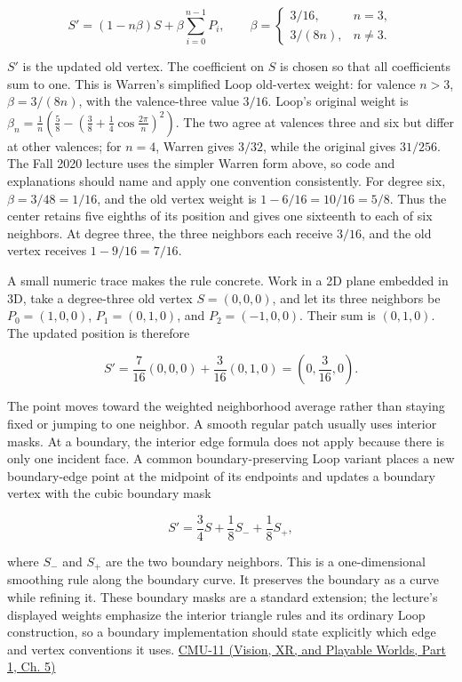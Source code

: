 \[
S'=(1-n\beta)S+\beta\sum_{i=0}^{n-1}P_i,
\qquad
\beta=\begin{cases}
3/16,&n=3,\\
3/(8n),&n\ne3.
\end{cases}
\]

\(S'\) is the updated old vertex. The coefficient on \(S\) is chosen so that all coefficients sum to one. This is Warren's simplified Loop old-vertex weight: for valence \(n>3\), \(\beta=3/(8n)\), with the valence-three value \(3/16\). Loop's original weight is \(\beta_n=\frac1n\left(\frac58-\left(\frac38+\frac14\cos\frac{2\pi}{n}\right)^2\right)\). The two agree at valences three and six but differ at other valences; for \(n=4\), Warren gives \(3/32\), while the original gives \(31/256\). The Fall 2020 lecture uses the simpler Warren form above, so code and explanations should name and apply one convention consistently. For degree six, \(\beta=3/48=1/16\), and the old vertex weight is \(1-6/16=10/16=5/8\). Thus the center retains five eighths of its position and gives one sixteenth to each of six neighbors. At degree three, the three neighbors each receive \(3/16\), and the old vertex receives \(1-9/16=7/16\).

A small numeric trace makes the rule concrete. Work in a 2D plane embedded in 3D, take a degree-three old vertex \(S=(0,0,0)\), and let its three neighbors be \(P_0=(1,0,0)\), \(P_1=(0,1,0)\), and \(P_2=(-1,0,0)\). Their sum is \((0,1,0)\). The updated position is therefore

\[
S'=\frac{7}{16}(0,0,0)+\frac{3}{16}(0,1,0)
=\left(0,\frac{3}{16},0\right).
\]

The point moves toward the weighted neighborhood average rather than staying fixed or jumping to one neighbor. A smooth regular patch usually uses interior masks. At a boundary, the interior edge formula does not apply because there is only one incident face. A common boundary-preserving Loop variant places a new boundary-edge point at the midpoint of its endpoints and updates a boundary vertex with the cubic boundary mask

\[
S'=\frac{3}{4}S+\frac{1}{8}S_{-}+\frac{1}{8}S_{+},
\]

where \(S_{-}\) and \(S_{+}\) are the two boundary neighbors. This is a one-dimensional smoothing rule along the boundary curve. It preserves the boundary as a curve while refining it. These boundary masks are a standard extension; the lecture's displayed weights emphasize the interior triangle rules and its ordinary Loop construction, so a boundary implementation should state explicitly which edge and vertex conventions it uses. \href{../07-Vision-XR-and-Playable-Worlds-P01/main.pdf\#nameddest=04-visual-computing-ii-ch036-cmu-11---digital-geometry-processing}{CMU-11 (Vision, XR, and Playable Worlds, Part 1, Ch. 5)}


